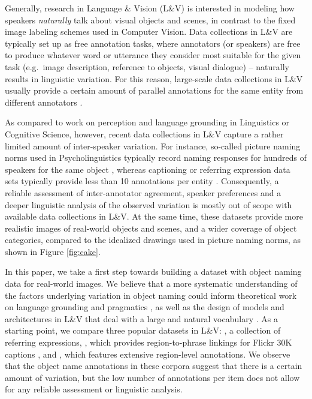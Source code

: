 Generally, research in Language \& Vision (L\&V) is interested in modeling how speakers \textit{naturally} talk about visual objects and scenes, in contrast to the fixed image labeling schemes used in Computer Vision.
Data collections in L\&V are typically set up as free annotation tasks,  where annotators (or speakers) are free to produce whatever word or utterance they consider most suitable for the given task (e.g.\ image description, reference to objects, visual dialogue) -- naturally results in linguistic variation.
For this reason, large-scale data collections in L\&V usually provide a certain amount of parallel annotations for the same entity from different annotators \cite{fangetal:2015,devlin:imcaqui,Kazemzadeh2014,mao15,vries2017guesswhat}.

As compared to work on perception and language grounding in Linguistics or Cognitive Science, however, recent data collections in L\&V capture a rather limited amount of inter-speaker variation.
For instance, so-called picture naming norms used in Psycholinguistics typically record naming responses for hundreds of speakers for the same object  \cite{snodgrass,rossion2004revisiting}, whereas captioning or referring expression data sets typically provide less than 10 annotations per entity \cite{devlin:imcaqui,Kazemzadeh2014,mao15}.
Consequently, a reliable assessment of inter-annotator agreement, speaker preferences and a deeper linguistic analysis of the observed variation is mostly out of scope with available data collections in  L\&V.
At the same time, these datasets provide more realistic images of real-world objects and scenes, and a wider coverage of object categories, compared to the idealized drawings used in picture naming norms, as shown in Figure \ref{fig:cake}.

In this paper, we take a first step towards building a dataset with object naming data for real-world images. We believe that a more systematic understanding of the factors underlying variation in object naming could inform theoretical work on language grounding and pragmatics \cite{rohde2012communicating,graf2016animal}, as well as the design of models and architectures in L\&V that deal with a large and natural vocabulary \cite{lazaridou-dinu-baroni:2015:ACL-IJCNLP,Ordonez:2016,zhao2017open}. As a starting point, we compare three popular datasets in L\&V:  \cite{Yu2016}, a collection of referring expressions, \flickr \cite{plummer2015flickr30kentities}, which provides region-to-phrase linkings for Flickr 30K captions \cite{young:2014}, and \vgenome \cite{krishna2016visualgenome}, which features extensive region-level annotations. We observe that the object name annotations in these corpora suggest that there is a certain amount of variation, but the low number of annotations per item does not allow for any reliable assessment or linguistic analysis.


